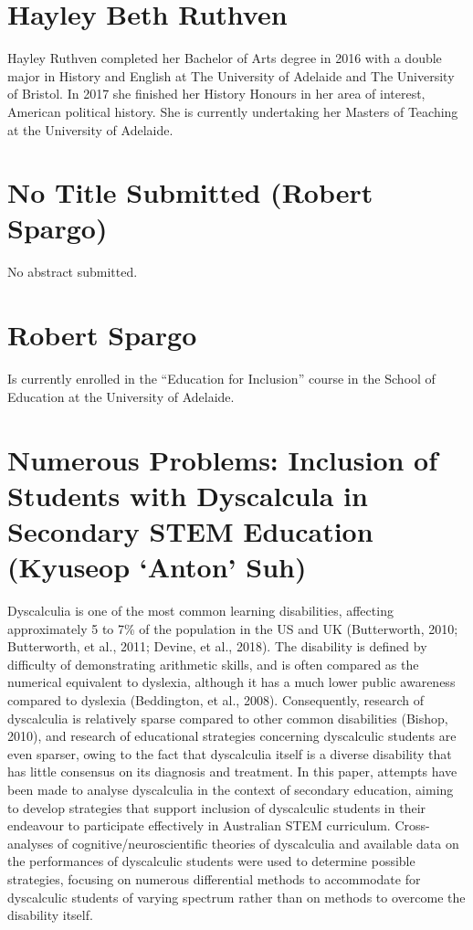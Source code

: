 \documentclass[twoside,12pt,a4paper,notitlepage]{memoir}
\begin{document}
\section*{Hayley Beth Ruthven}

Hayley Ruthven completed her Bachelor of Arts degree in 2016 with a double major in History and English at The University of Adelaide and The University of Bristol. In 2017 she finished her History Honours in her area of interest, American political history. She is currently undertaking her Masters of Teaching at the University of Adelaide.



\pagebreak
\section*{No Title Submitted (Robert Spargo)}
\label{aut:spargo}

No abstract submitted.

\section*{Robert Spargo}

Is currently enrolled in the ``Education for Inclusion'' course in the School of Education at the University of Adelaide.



\pagebreak
\section*{Numerous Problems: Inclusion of Students with Dyscalcula in Secondary STEM Education (Kyuseop `Anton' Suh)}
\label{aut:suh}

Dyscalculia is one of the most common learning disabilities, affecting approximately 5 to 7\% of the population in the US and UK (Butterworth, 2010; Butterworth, et al., 2011; Devine, et al., 2018). The disability is defined by difficulty of demonstrating arithmetic skills, and is often compared as the numerical equivalent to dyslexia, although it has a much lower public awareness compared to dyslexia (Beddington, et al., 2008). Consequently, research of dyscalculia is relatively sparse compared to other common disabilities (Bishop, 2010), and research of educational strategies concerning dyscalculic students are even sparser, owing to the fact that dyscalculia itself is a diverse disability that has little consensus on its diagnosis and treatment. In this paper, attempts have been made to analyse dyscalculia in the context of secondary education, aiming to develop strategies that support inclusion of dyscalculic students in their endeavour to participate effectively in Australian STEM curriculum. Cross-analyses of cognitive/neuroscientific theories of dyscalculia and available data on the performances of dyscalculic students were used to determine possible strategies, focusing on numerous differential methods to accommodate for dyscalculic students of varying spectrum rather than on methods to overcome the disability itself.
\end{document}
